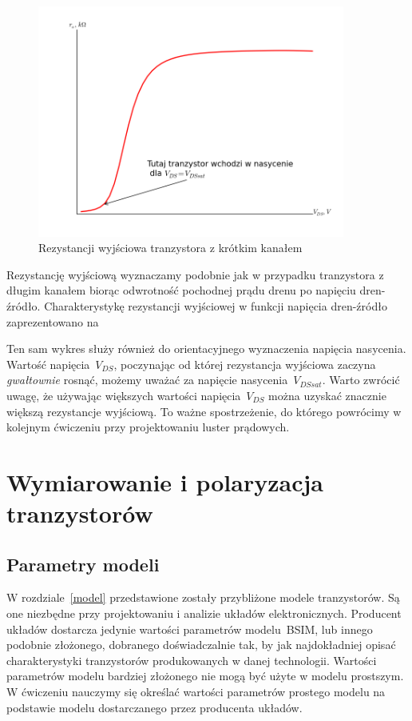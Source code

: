\documentclass[twoside,pl,final]{labman}
\begin{document}
\begin{figure}[!htbp]
  \centering
  \includegraphics[width=0.9\textwidth]{short_ro}
  \caption{Rezystancji wyjściowa tranzystora z krótkim kanałem}
  \label{fig:short:ro}
\end{figure}

Rezystancję wyjściową wyznaczamy podobnie jak w przypadku tranzystora z długim
kanałem biorąc odwrotność pochodnej prądu drenu po napięciu dren-źródło.
Charakterystykę rezystancji wyjściowej w funkcji
napięcia dren-źródło zaprezentowano na~

Ten sam wykres służy również do orientacyjnego wyznaczenia napięcia nasycenia.
Wartość napięcia~$V_{DS}$, poczynając od której rezystancja wyjściowa zaczyna
\emph{gwałtownie} rosnąć, możemy uważać za napięcie nasycenia~$V_{DSsat}$.
Warto zwrócić uwagę, że używając większych wartości napięcia~$V_{DS}$
można uzyskać znacznie większą rezystancje wyjściową.
To ważne spostrzeżenie, do którego powrócimy w kolejnym
ćwiczeniu przy projektowaniu luster prądowych.

\FloatBarrier
\chapter{Wymiarowanie i polaryzacja tranzystorów}
\label{sizing}

\section{Parametry modeli}
\label{sizing:params}

W rozdziale~\ref{model} przedstawione zostały przybliżone modele tranzystorów.
Są one niezbędne przy projektowaniu i analizie układów elektronicznych.
Producent układów dostarcza jedynie wartości parametrów modelu~BSIM,
lub innego podobnie złożonego, dobranego doświadczalnie tak,
by jak najdokładniej opisać charakterystyki tranzystorów produkowanych w danej technologii.
Wartości parametrów modelu bardziej złożonego nie mogą być użyte w modelu prostszym.
W ćwiczeniu nauczymy się określać wartości parametrów prostego modelu na
podstawie modelu dostarczanego przez producenta układów.
\end{document}
